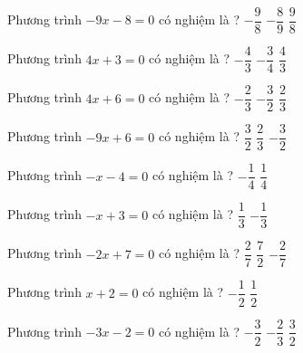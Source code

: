 \begin{ex} 
 Phương trình $-9x-8=0$ có nghiệm là ? 
 {$- \dfrac{ 9 }{ 8 } $} 
 {\True $- \dfrac{ 8 }{ 9 } $} 
 {$ \dfrac{ 9 }{ 8 } $}  
 \loigiai{} 
 \end{ex} 
 
\begin{ex} 
 Phương trình $4x+3=0$ có nghiệm là ? 
 {$- \dfrac{ 4 }{ 3 } $} 
 {\True $- \dfrac{ 3 }{ 4 } $} 
 {$ \dfrac{ 4 }{ 3 } $}  
 \loigiai{} 
 \end{ex} 
 
\begin{ex} 
 Phương trình $4x+6=0$ có nghiệm là ? 
 {$- \dfrac{ 2 }{ 3 } $} 
 {\True $- \dfrac{ 3 }{ 2 } $} 
 {$ \dfrac{ 2 }{ 3 } $}  
 \loigiai{} 
 \end{ex} 
 
\begin{ex} 
 Phương trình $-9x+6=0$ có nghiệm là ? 
 {$ \dfrac{ 3 }{ 2 } $} 
 {\True $ \dfrac{ 2 }{ 3 } $} 
 {$- \dfrac{ 3 }{ 2 } $}  
 \loigiai{} 
 \end{ex} 
 
\begin{ex} 
 Phương trình $-x-4=0$ có nghiệm là ? 
 {$- \dfrac{ 1 }{ 4 } $} 
 {} 
 {$ \dfrac{ 1 }{ 4 } $}  
 \loigiai{} 
 \end{ex} 
 
\begin{ex} 
 Phương trình $-x+3=0$ có nghiệm là ? 
 {$ \dfrac{ 1 }{ 3 } $} 
 {} 
 {$- \dfrac{ 1 }{ 3 } $}  
 \loigiai{} 
 \end{ex} 
 
\begin{ex} 
 Phương trình $-2x+7=0$ có nghiệm là ? 
 {$ \dfrac{ 2 }{ 7 } $} 
 {\True $ \dfrac{ 7 }{ 2 } $} 
 {$- \dfrac{ 2 }{ 7 } $}  
 \loigiai{} 
 \end{ex} 
 
\begin{ex} 
 Phương trình $x+2=0$ có nghiệm là ? 
 {$- \dfrac{ 1 }{ 2 } $} 
 {} 
 {$ \dfrac{ 1 }{ 2 } $}  
 \loigiai{} 
 \end{ex} 
 
\begin{ex} 
 Phương trình $-3x-2=0$ có nghiệm là ? 
 {$- \dfrac{ 3 }{ 2 } $} 
 {\True $- \dfrac{ 2 }{ 3 } $} 
 {$ \dfrac{ 3 }{ 2 } $}  
 \loigiai{} 
 \end{ex} 
 
